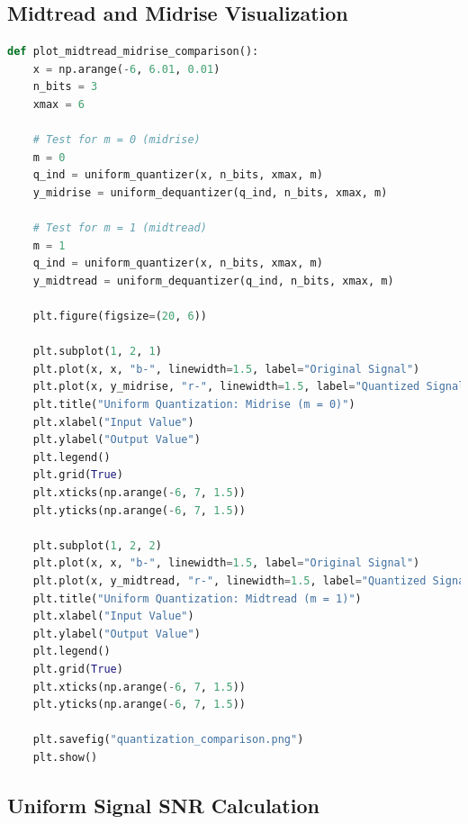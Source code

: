 \documentclass{article}
\begin{document}
\subsection{Midtread and Midrise Visualization}

\begin{lstlisting}[language=Python, caption=Midtread and Midrise Quantization Visualization]
def plot_midtread_midrise_comparison():
    x = np.arange(-6, 6.01, 0.01)
    n_bits = 3
    xmax = 6

    # Test for m = 0 (midrise)
    m = 0
    q_ind = uniform_quantizer(x, n_bits, xmax, m)
    y_midrise = uniform_dequantizer(q_ind, n_bits, xmax, m)

    # Test for m = 1 (midtread)
    m = 1
    q_ind = uniform_quantizer(x, n_bits, xmax, m)
    y_midtread = uniform_dequantizer(q_ind, n_bits, xmax, m)

    plt.figure(figsize=(20, 6))

    plt.subplot(1, 2, 1)
    plt.plot(x, x, "b-", linewidth=1.5, label="Original Signal")
    plt.plot(x, y_midrise, "r-", linewidth=1.5, label="Quantized Signal")
    plt.title("Uniform Quantization: Midrise (m = 0)")
    plt.xlabel("Input Value")
    plt.ylabel("Output Value")
    plt.legend()
    plt.grid(True)
    plt.xticks(np.arange(-6, 7, 1.5))
    plt.yticks(np.arange(-6, 7, 1.5))

    plt.subplot(1, 2, 2)
    plt.plot(x, x, "b-", linewidth=1.5, label="Original Signal")
    plt.plot(x, y_midtread, "r-", linewidth=1.5, label="Quantized Signal")
    plt.title("Uniform Quantization: Midtread (m = 1)")
    plt.xlabel("Input Value")
    plt.ylabel("Output Value")
    plt.legend()
    plt.grid(True)
    plt.xticks(np.arange(-6, 7, 1.5))
    plt.yticks(np.arange(-6, 7, 1.5))

    plt.savefig("quantization_comparison.png")
    plt.show()
\end{lstlisting}

\subsection{Uniform Signal SNR Calculation}
\end{document}
